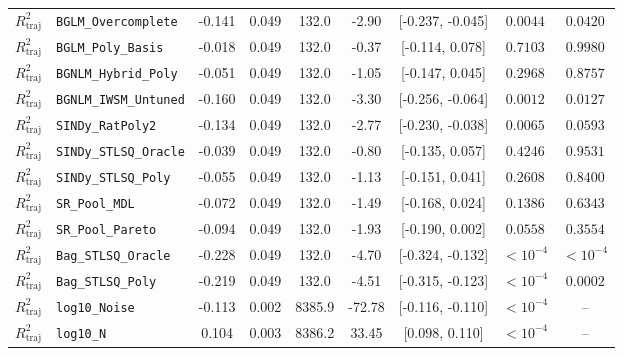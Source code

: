 \begin{table}[t]
\begin{tabular}{llccccccc}
$R^2_{\text{traj}}$ & \texttt{BGLM\_Overcomplete} & -0.141 & 0.049 & 132.0 & -2.90 & [-0.237, -0.045] & $0.0044$ & $0.0420$ \\
$R^2_{\text{traj}}$ & \texttt{BGLM\_Poly\_Basis} & -0.018 & 0.049 & 132.0 & -0.37 & [-0.114, 0.078] & $0.7103$ & $0.9980$ \\
$R^2_{\text{traj}}$ & \texttt{BGNLM\_Hybrid\_Poly} & -0.051 & 0.049 & 132.0 & -1.05 & [-0.147, 0.045] & $0.2968$ & $0.8757$ \\
$R^2_{\text{traj}}$ & \texttt{BGNLM\_IWSM\_Untuned} & -0.160 & 0.049 & 132.0 & -3.30 & [-0.256, -0.064] & $0.0012$ & $0.0127$ \\
$R^2_{\text{traj}}$ & \texttt{SINDy\_RatPoly2} & -0.134 & 0.049 & 132.0 & -2.77 & [-0.230, -0.038] & $0.0065$ & $0.0593$ \\
$R^2_{\text{traj}}$ & \texttt{SINDy\_STLSQ\_Oracle} & -0.039 & 0.049 & 132.0 & -0.80 & [-0.135, 0.057] & $0.4246$ & $0.9531$ \\
$R^2_{\text{traj}}$ & \texttt{SINDy\_STLSQ\_Poly} & -0.055 & 0.049 & 132.0 & -1.13 & [-0.151, 0.041] & $0.2608$ & $0.8400$ \\
$R^2_{\text{traj}}$ & \texttt{SR\_Pool\_MDL} & -0.072 & 0.049 & 132.0 & -1.49 & [-0.168, 0.024] & $0.1386$ & $0.6343$ \\
$R^2_{\text{traj}}$ & \texttt{SR\_Pool\_Pareto} & -0.094 & 0.049 & 132.0 & -1.93 & [-0.190, 0.002] & $0.0558$ & $0.3554$ \\
$R^2_{\text{traj}}$ & \texttt{Bag\_STLSQ\_Oracle} & -0.228 & 0.049 & 132.0 & -4.70 & [-0.324, -0.132] & $< 10^{-4}$ & $< 10^{-4}$ \\
$R^2_{\text{traj}}$ & \texttt{Bag\_STLSQ\_Poly} & -0.219 & 0.049 & 132.0 & -4.51 & [-0.315, -0.123] & $< 10^{-4}$ & $0.0002$ \\
$R^2_{\text{traj}}$ & \texttt{log10\_Noise} & -0.113 & 0.002 & 8385.9 & -72.78 & [-0.116, -0.110] & $< 10^{-4}$ & -- \\
$R^2_{\text{traj}}$ & \texttt{log10\_N} & 0.104 & 0.003 & 8386.2 & 33.45 & [0.098, 0.110] & $< 10^{-4}$ & -- \\
\bottomrule
\end{tabular}
\end{table}
